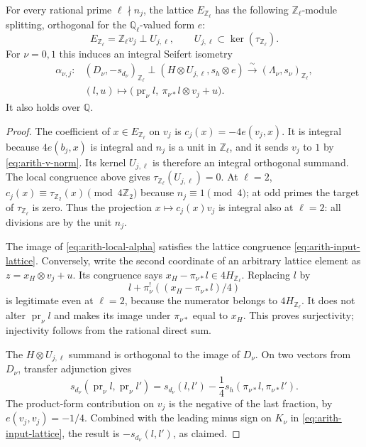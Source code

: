 \begin{lemma}\label{lem:arith-local-splitting}
For every rational prime $\ell\nmid n_j$, the lattice
$E_{\mathbb Z_\ell}$ has the following $\mathbb Z_\ell$-module
splitting, orthogonal for the $\mathbb Q_\ell$-valued form $e$:
\[
 E_{\mathbb Z_\ell}=
 \mathbb Z_\ell v_j\perp U_{j,\ell},
 \qquad U_{j,\ell}\subset\ker(\tau_{\mathbb Z_\ell}).
\]
For $\nu=0,1$ this induces an integral Seifert isometry
\begin{equation}\label{eq:arith-local-alpha}
 \begin{split}
 \alpha_{\nu,j}\colon
 &(D_\nu,-s_{d_\nu})_{\mathbb Z_\ell}
       \perp(H\otimes U_{j,\ell},s_h\otimes e)
       \xrightarrow{\ \sim\ }(\Lambda_\nu,s_\nu)_{\mathbb Z_\ell},\\
 &(l,u)\longmapsto
 \bigl(\operatorname{pr}_\nu l,\ \pi_{\nu*}l\otimes v_j+u\bigr).
 \end{split}
\end{equation}
It also holds over $\mathbb Q$.
\end{lemma}

\begin{proof}
The coefficient of $x\in E_{\mathbb Z_\ell}$ on $v_j$ is
$c_j(x)=-4e(v_j,x)$.  It is integral because $4e(b_j,x)$ is integral and
$n_j$ is a unit in $\mathbb Z_\ell$, and it sends $v_j$ to $1$ by
\eqref{eq:arith-v-norm}.  Its kernel $U_{j,\ell}$ is therefore an
integral orthogonal summand. The local congruence above gives
$\tau_{\mathbb Z_\ell}(U_{j,\ell})=0$. At $\ell=2$,
$c_j(x)\equiv\tau_{\mathbb Z_2}(x)\pmod{4\mathbb Z_2}$
because $n_j\equiv1\pmod4$;
at odd primes the target of $\tau_{\mathbb Z_\ell}$ is zero.
Thus the projection $x\mapsto c_j(x)v_j$ is integral also at
$\ell=2$: all divisions are by the unit $n_j$.

The image of \eqref{eq:arith-local-alpha} satisfies the lattice
congruence \eqref{eq:arith-input-lattice}.  Conversely, write the second
coordinate of an arbitrary lattice element as
$z=x_H\otimes v_j+u$.  Its congruence says
$x_H-\pi_{\nu*}l\in4H_{\mathbb Z_\ell}$.  Replacing $l$ by
\[
 l+\pi_\nu^!\left((x_H-\pi_{\nu*}l)/4\right)
\]
is legitimate even at $\ell=2$, because the numerator belongs to
$4H_{\mathbb Z_\ell}$. It does not alter $\operatorname{pr}_\nu l$ and makes its image under
$\pi_{\nu*}$ equal to $x_H$.  This proves surjectivity; injectivity
follows from the rational direct sum.

The $H\otimes U_{j,\ell}$ summand is orthogonal to the image of $D_\nu$.
On two vectors from $D_\nu$, transfer adjunction gives
\[
 s_{d_\nu}(\operatorname{pr}_\nu l,
                  \operatorname{pr}_\nu l')
 =s_{d_\nu}(l,l')-
        \frac14s_h(\pi_{\nu*}l,\pi_{\nu*}l').
\]
The product-form contribution on $v_j$ is the negative of the last
fraction, by $e(v_j,v_j)=-1/4$.  Combined with the leading minus sign
on $K_\nu$ in \eqref{eq:arith-input-lattice}, the result is
$-s_{d_\nu}(l,l')$, as claimed.
\end{proof}

